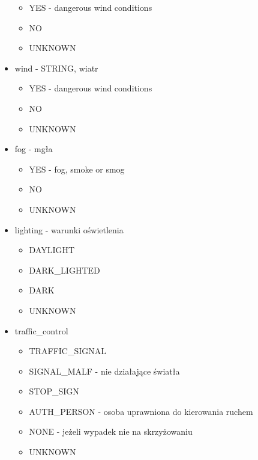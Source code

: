\begin{itemize}
  \begin{itemize}
  \itemsep-14pt\parskip0pt
  \item
    YES - dangerous wind conditions\\
  \item
    NO\\
  \item
    UNKNOWN\\
  \end{itemize}
\item
  wind - STRING, wiatr

  \begin{itemize}
  \itemsep-14pt\parskip0pt
  \item
    YES - dangerous wind conditions\\
  \item
    NO\\
  \item
    UNKNOWN\\
  \end{itemize}
\item
  fog - mgła

  \begin{itemize}
  \itemsep-14pt\parskip0pt
  \item
    YES - fog, smoke or smog\\
  \item
    NO\\
  \item
    UNKNOWN\\
  \end{itemize}
\item
  lighting - warunki oświetlenia

  \begin{itemize}
  \itemsep-14pt\parskip0pt
  \item
    DAYLIGHT\\
  \item
    DARK\_LIGHTED\\
  \item
    DARK\\
  \item
    UNKNOWN\\
  \end{itemize}
\item
  traffic\_control

  \begin{itemize}
  \itemsep-14pt\parskip0pt
  \item
    TRAFFIC\_SIGNAL\\
  \item
    SIGNAL\_MALF - nie działające światła\\
  \item
    STOP\_SIGN\\
  \item
    AUTH\_PERSON - osoba uprawniona do kierowania ruchem\\
  \item
    NONE - jeżeli wypadek nie na skrzyżowaniu\\
  \item
    UNKNOWN
  \end{itemize}
\end{itemize}

